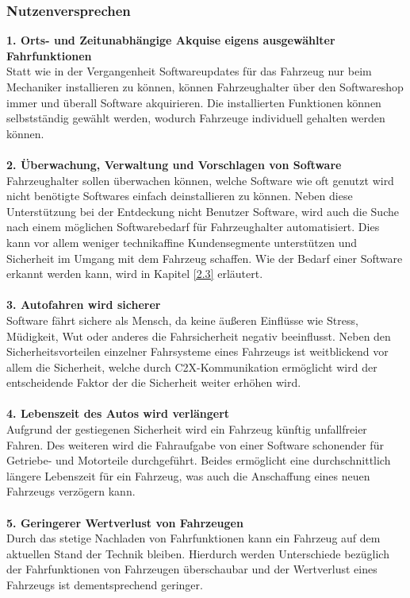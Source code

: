 \subsubsection{Nutzenversprechen}
\textbf{1. Orts- und Zeitunabhängige Akquise eigens ausgewählter Fahrfunktionen}\\
Statt wie in der Vergangenheit Softwareupdates für das Fahrzeug nur beim Mechaniker installieren zu können, können Fahrzeughalter über den Softwareshop immer und überall Software akquirieren. Die installierten Funktionen können selbstständig gewählt werden, wodurch Fahrzeuge individuell gehalten werden können.\\\\
\textbf{2. Überwachung, Verwaltung und Vorschlagen von Software}\\
Fahrzeughalter sollen überwachen können, welche Software wie oft genutzt wird nicht benötigte Softwares einfach deinstallieren zu können. Neben diese Unterstützung bei der Entdeckung nicht Benutzer Software, wird auch die Suche nach einem möglichen Softwarebedarf für Fahrzeughalter automatisiert. Dies kann vor allem weniger technikaffine Kundensegmente unterstützen und Sicherheit im Umgang mit dem Fahrzeug schaffen. Wie der Bedarf einer Software erkannt werden kann, wird in Kapitel \ref{2.3} erläutert.\\\\
\textbf{3. Autofahren wird sicherer}\\
Software fährt sichere als Mensch, da keine äußeren Einflüsse wie Stress, Müdigkeit, Wut oder anderes die Fahrsicherheit negativ beeinflusst. Neben den Sicherheitsvorteilen einzelner Fahrsysteme eines Fahrzeugs ist weitblickend vor allem die Sicherheit, welche durch C2X-Kommunikation ermöglicht wird der entscheidende Faktor der die Sicherheit weiter erhöhen wird.\\\\
\textbf{4. Lebenszeit des Autos wird verlängert}\\
Aufgrund der gestiegenen Sicherheit wird ein Fahrzeug künftig unfallfreier Fahren. Des weiteren wird die Fahraufgabe von einer Software schonender für Getriebe- und Motorteile durchgeführt. Beides ermöglicht eine durchschnittlich längere Lebenszeit für ein Fahrzeug, was auch die Anschaffung eines neuen Fahrzeugs verzögern kann.\\\\
\textbf{5. Geringerer Wertverlust von Fahrzeugen}\\
Durch das stetige Nachladen von Fahrfunktionen kann ein Fahrzeug auf dem aktuellen Stand der Technik bleiben. Hierdurch werden Unterschiede bezüglich der Fahrfunktionen von Fahrzeugen überschaubar und der Wertverlust eines Fahrzeugs ist dementsprechend geringer.\\\\
